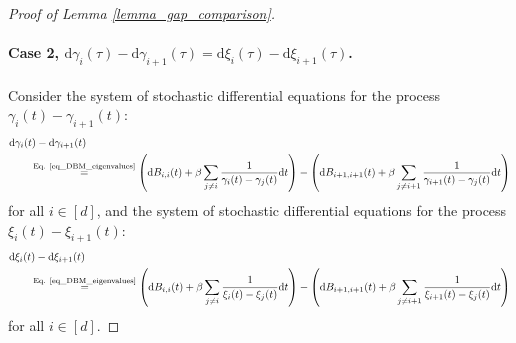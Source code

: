 \documentclass[11pt,letterpaper]{article}
\begin{document}
\begin{proof}[Proof of Lemma \ref{lemma_gap_comparison}]
\paragraph{Case 2, $\mathrm{d} \gamma_i(\tau) - \mathrm{d}  \gamma_{i+1}(\tau) = \mathrm{d} \xi_i(\tau) - \mathrm{d}  \xi_{i+1}(\tau)$.}


Consider the system of stochastic differential equations for the process $\gamma_i(t) - \gamma_{i+1} (t)$:
\begin{align}\label{eq_w9}
&\mathrm{d} \gamma_i(t) - \mathrm{d} \gamma_{i+1} (t) 
%
\nonumber\\
%
& \qquad 
%
\stackrel{\textrm{Eq. \eqref{eq_DBM_eigenvalues}}}{=}  \left(\mathrm{d}B_{i, i}(t) +  \beta \sum_{j \neq i} \frac{1}{\gamma_i(t) - \gamma_j(t)} \mathrm{d}t \right) -  \left(\mathrm{d}B_{i+1, i+1}(t) +  \beta \sum_{j \neq i+1} \frac{1}{\gamma_{i+1}(t) - \gamma_j(t)} \mathrm{d}t \right)
\end{align}
%
for all $i \in [d]$, and the system of stochastic differential equations for the process $\xi_i(t) - \xi_{i+1} (t)$:
%
\begin{align}\label{eq_w10}
 &\mathrm{d} \xi_i(t) - \mathrm{d} \xi_{i+1} (t)
 \nonumber\\
%
& \qquad 
 \stackrel{\textrm{Eq. \eqref{eq_DBM_eigenvalues}}}{=}
%
\left(\mathrm{d}B_{i, i}(t) +  \beta \sum_{j \neq i} \frac{1}{\xi_i(t) - \xi_j(t)} \mathrm{d}t \right)  -  \left(\mathrm{d}B_{i+1, i+1}(t) +  \beta \sum_{j \neq i+1} \frac{1}{\xi_{i+1}(t) - \xi_j(t)} \mathrm{d}t \right)
\end{align}
for all $i \in [d]$. 


\end{proof}
\end{document}
